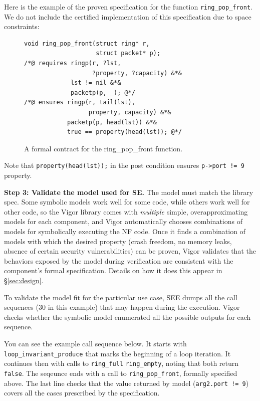 \documentclass[letterpaper,twocolumn,10pt]{article}
\newcommand{\code}[1]{\lstinline{#1}}
\begin{document}
Here is the example of the proven specification for the function
\code{ring_pop_front}. We do not include the certified implementation of this
specification due to space constraints:

\begin{figure}[h!]
\begin{lstlisting}
void ring_pop_front(struct ring* r,
                    struct packet* p);
/*@ requires ringp(r, ?lst,
                   ?property, ?capacity) &*&
             lst != nil &*&
             packetp(p, _); @*/
/*@ ensures ringp(r, tail(lst),
                  property, capacity) &*&
            packetp(p, head(lst)) &*&
            true == property(head(lst)); @*/
\end{lstlisting}
  \caption{A formal contract for the ring\_pop\_front function.}
  \label{lst:contract}
\end{figure}

Note that \code{property(head(lst));} in the post condition ensures \code{p->port != 9} property.

{\bf Step 3: Validate the model used for SE.}
The model must match the library spec. Some symbolic models work well for some code, while others work well for other code, so the Vigor library comes with {\em multiple} simple, overapproximating models for each component, and Vigor automatically chooses combinations of models for symbolically executing the NF code. Once it finds a combination of models with which the desired property (crash freedom, no memory leaks, absence of certain security vulnerabilities) can be proven, Vigor validates that the behaviors exposed by the model during verification are consistent with the component's formal specification.  Details on how it does this appear in \S\ref{sec:design}.

To validate the model fit for the particular use case, SEE dumps
all the call sequences (30 in this example) that may happen during the execution.
Vigor checks whether the symbolic model enumerated all the possible
outputs for each sequence.

You can see the example call sequence below. It starts with
\code{loop_invariant_produce} that marks the beginning of a loop iteration. It
continues then with calls to \code{ring_full} \code{ring_empty}, noting that
both return \code{false}. The seqeunce ends with a call to
\code{ring_pop_front}, formally specified above. The last line checks that the
value returned by model (\code{arg2.port != 9}) covers all the cases prescribed
by the specification.
 
\end{document}
